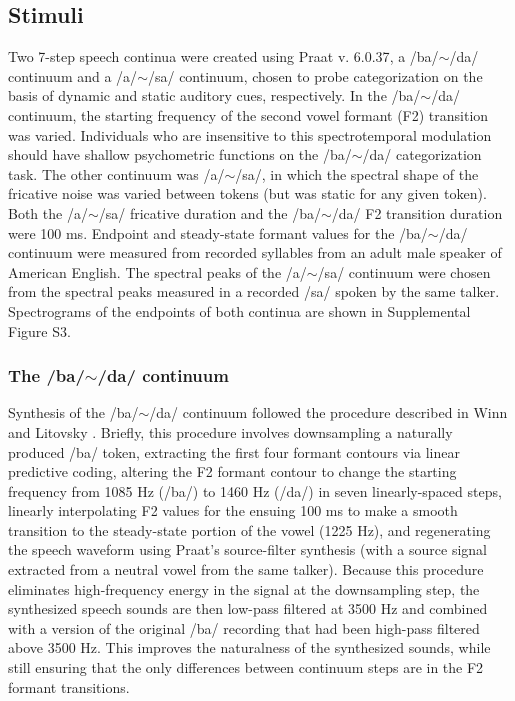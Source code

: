 \documentclass[../uwthesis.tex]{subfiles}
\begin{document}
\subsection{Stimuli}
Two 7-step speech continua were created using Praat v. 6.0.37\cite{Boersma2019Praat:Computer}, a /ba/$\sim$/da/ continuum and a /a/$\sim$/sa/ continuum, chosen to probe categorization on the basis of dynamic and static auditory cues, respectively. In the /ba/$\sim$/da/ continuum, the starting frequency of the second vowel formant (F2) transition was varied. Individuals who are insensitive to this spectrotemporal modulation should have shallow psychometric functions on the /ba/$\sim$/da/ categorization task. The other continuum was /a/$\sim$/sa/, in which the spectral shape of the fricative noise was varied between tokens (but was static for any given token). Both the /a/$\sim$/sa/ fricative duration and the /ba/$\sim$/da/ F2 transition duration were 100 ms. Endpoint and steady-state formant values for the /ba/$\sim$/da/ continuum were measured from recorded syllables from an adult male speaker of American English. The spectral peaks of the /a/$\sim$/sa/ continuum were chosen from the spectral peaks measured in a recorded /sa/ spoken by the same talker. Spectrograms of the endpoints of both continua are shown in Supplemental Figure S3.

\subsubsection{The /ba/$\sim$/da/ continuum}
Synthesis of the /ba/$\sim$/da/ continuum followed the procedure described in Winn and Litovsky \cite{Winn2015}. Briefly, this procedure involves downsampling a naturally produced /ba/ token, extracting the first four formant contours via linear predictive coding, altering the F2 formant contour to change the starting frequency from 1085 Hz (/ba/) to 1460 Hz (/da/) in seven linearly-spaced steps, linearly interpolating F2 values for the ensuing 100 ms to make a smooth transition to the steady-state portion of the vowel (1225 Hz), and regenerating the speech waveform using Praat's source-filter synthesis (with a source signal extracted from a neutral vowel from the same talker). Because this procedure eliminates high-frequency energy in the signal at the downsampling step, the synthesized speech sounds are then low-pass filtered at 3500 Hz and combined with a version of the original /ba/ recording that had been high-pass filtered above 3500 Hz. This improves the naturalness of the synthesized sounds, while still ensuring that the only differences between continuum steps are in the F2 formant transitions.
\end{document}
